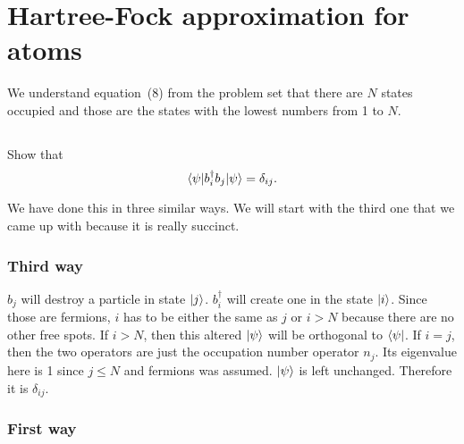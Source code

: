 \documentclass[11pt, english, fleqn, DIV=15, headinclude, BCOR=1.5cm]{scrartcl}
\begin{document}
\section{Hartree-Fock approximation for atoms}

We understand equation~(8) from the problem set that there are $N$ states
occupied and those are the states with the lowest numbers from 1 to $N$.

\subsection{}

\begin{problem}
    Show that
    \[
        \braket{\psi|b_i^\dagger b_j|\psi} = \delta_{ij}.
    \]
\end{problem}

We have done this in three similar ways. We will start with the third one that
we came up with because it is really succinct.

\subsubsection{Third way}

$b_j$ will destroy a particle in state $\ket j$. $b_i^\dagger$ will create one
in the state $\ket i$. Since those are fermions, $i$ has to be either the same
as $j$ or $i > N$ because there are no other free spots. If $i > N$, then this
altered $\ket \psi$ will be orthogonal to $\bra \psi$. If $i = j$, then the two
operators are just the occupation number operator $n_j$. Its eigenvalue here is
1 since $j \leq N$ and fermions was assumed. $\ket \psi$ is left unchanged.
Therefore it is $\delta_{ij}$.

\subsubsection{First way}
\end{document}
